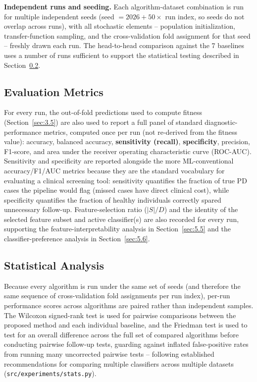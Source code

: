 \textbf{Independent runs and seeding.} Each algorithm-dataset combination
is run for multiple independent seeds (seed $= 2026 + 50 \times$
run index, so seeds do not overlap across runs), with all stochastic
elements -- population initialization, transfer-function sampling, and
the cross-validation fold assignment for that seed -- freshly drawn each
run. The head-to-head comparison against the 7 baselines uses a number of
runs sufficient to support the statistical testing described in
Section~\ref{sec:3.9}.

\subsection{Evaluation Metrics}
\label{sec:3.8}

For every run, the out-of-fold predictions used to compute fitness
(Section~\ref{sec:3.5}) are also used to report a full panel
of standard diagnostic-performance metrics, computed once per run (not
re-derived from the fitness value): accuracy, balanced accuracy,
\textbf{sensitivity (recall)}, \textbf{specificity}, precision, F1-score,
and area under the receiver operating characteristic curve (ROC-AUC).
Sensitivity and specificity are reported alongside the more
ML-conventional accuracy/F1/AUC metrics because they are the standard
vocabulary for evaluating a clinical screening tool: sensitivity
quantifies the fraction of true PD cases the pipeline would flag (missed
cases have direct clinical cost), while specificity quantifies the
fraction of healthy individuals correctly spared unnecessary follow-up.
Feature-selection ratio ($|S|/D$) and the identity of the selected
feature subset and active classifier(s) are also recorded for every run,
supporting the feature-interpretability analysis in
Section~\ref{sec:5.5} and the classifier-preference analysis in
Section~\ref{sec:5.6}.

\subsection{Statistical Analysis}
\label{sec:3.9}

Because every algorithm is run under the same set of seeds (and therefore
the same sequence of cross-validation fold assignments per run index),
per-run performance scores across algorithms are paired rather than
independent samples. The Wilcoxon signed-rank test \cite{Wilcoxon:1945} is
used for pairwise comparisons between the proposed method and each
individual baseline, and the Friedman test \cite{Friedman:1937} is used
to test for an overall difference across the full set of compared
algorithms before conducting pairwise follow-up tests, guarding against
inflated false-positive rates from running many uncorrected pairwise
tests -- following established recommendations for comparing multiple
classifiers across multiple datasets \cite{Demsar:2006}
(\texttt{src/experiments/stats.py}).

